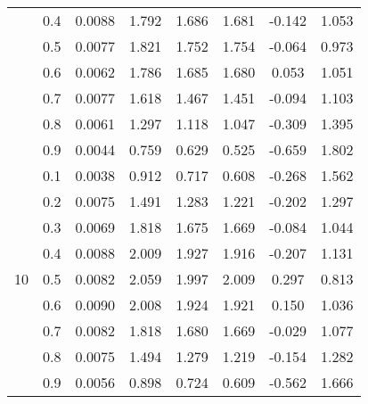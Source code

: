 \documentclass[11pt,a4paper]{report}
\begin{document}
\begin{longtable}{ | c | c || c | c | c | c | c | c | }
 & 0.4 & 0.0088 & 1.792 & 1.686 & 1.681 & -0.142 & 1.053 \\
 & 0.5 & 0.0077 & 1.821 & 1.752 & 1.754 & -0.064 & 0.973 \\
 & 0.6 & 0.0062 & 1.786 & 1.685 & 1.680 & 0.053 & 1.051 \\
 & 0.7 & 0.0077 & 1.618 & 1.467 & 1.451 & -0.094 & 1.103 \\
 & 0.8 & 0.0061 & 1.297 & 1.118 & 1.047 & -0.309 & 1.395 \\
 & 0.9 & 0.0044 & 0.759 & 0.629 & 0.525 & -0.659 & 1.802 \\
 \hline
\multirow{9}{*}{10} & 0.1 & 0.0038 & 0.912 & 0.717 & 0.608 & -0.268 & 1.562 \\
 & 0.2 & 0.0075 & 1.491 & 1.283 & 1.221 & -0.202 & 1.297 \\
 & 0.3 & 0.0069 & 1.818 & 1.675 & 1.669 & -0.084 & 1.044 \\
 & 0.4 & 0.0088 & 2.009 & 1.927 & 1.916 & -0.207 & 1.131 \\
 & 0.5 & 0.0082 & 2.059 & 1.997 & 2.009 & 0.297 & 0.813 \\
 & 0.6 & 0.0090 & 2.008 & 1.924 & 1.921 & 0.150 & 1.036 \\
 & 0.7 & 0.0082 & 1.818 & 1.680 & 1.669 & -0.029 & 1.077 \\
 & 0.8 & 0.0075 & 1.494 & 1.279 & 1.219 & -0.154 & 1.282 \\
 & 0.9 & 0.0056 & 0.898 & 0.724 & 0.609 & -0.562 & 1.666 \\
 \hline
\hline
\end{longtable}
\end{document}
